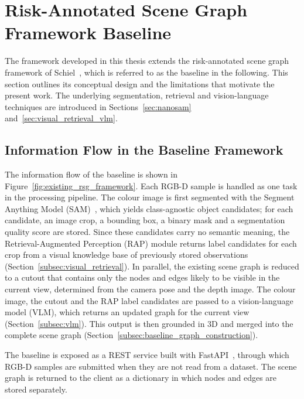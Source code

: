 {{{}








\section{Risk-Annotated Scene Graph Framework Baseline}
\label{sec:baseline_framework}

{\small The framework developed in this thesis extends the risk-annotated scene graph framework of Schiel~\cite{previous_rsg_thesis}, which is referred to as the baseline in the following. This section outlines its conceptual design and the limitations that motivate the present work. The underlying segmentation, retrieval and vision-language techniques are introduced in Sections~\ref{sec:nanosam} and~\ref{sec:visual_retrieval_vlm}.\par}

\subsection{Information Flow in the Baseline Framework}
\label{subsec:baseline_information_flow}

{\small The information flow of the baseline is shown in Figure~\ref{fig:existing_rsg_framework}. Each RGB-D sample is handled as one task in the processing pipeline. The colour image is first segmented with the Segment Anything Model (SAM)~\cite{kirillov2023segmentanything}, which yields class-agnostic object candidates; for each candidate, an image crop, a bounding box, a binary mask and a segmentation quality score are stored. Since these candidates carry no semantic meaning, the Retrieval-Augmented Perception (RAP) module returns label candidates for each crop from a visual knowledge base of previously stored observations (Section~\ref{subsec:visual_retrieval}). In parallel, the existing scene graph is reduced to a cutout that contains only the nodes and edges likely to be visible in the current view, determined from the camera pose and the depth image. The colour image, the cutout and the RAP label candidates are passed to a vision-language model (VLM), which returns an updated graph for the current view (Section~\ref{subsec:vlm}). This output is then grounded in 3D and merged into the complete scene graph (Section~\ref{subsec:baseline_graph_construction}).\par}

{\small The baseline is exposed as a REST service built with FastAPI~\cite{fastapi_docs}, through which RGB-D samples are submitted when they are not read from a dataset. The scene graph is returned to the client as a dictionary in which nodes and edges are stored separately.\label{subsec:baseline_fastapi}\par}

}}

